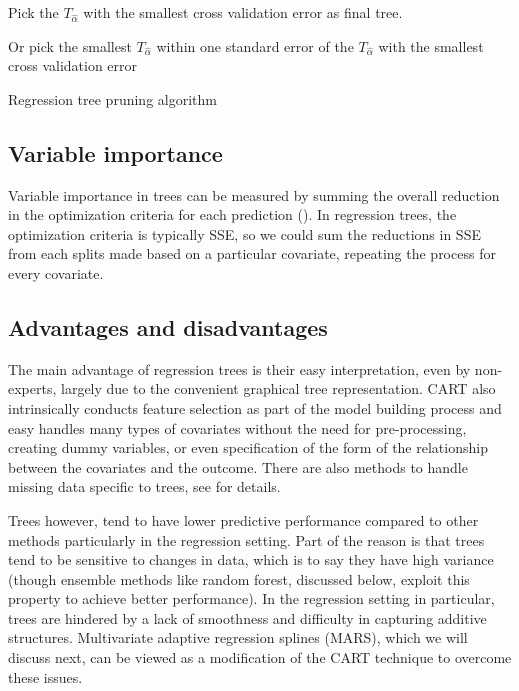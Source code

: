 \documentclass[12pt]{article}
\begin{document}
\begin{algorithm}[!htbp]
Pick the $T_{\hat{\alpha}}$ with the smallest cross validation error as final tree.

Or pick the smallest $T_{\hat{\alpha}}$ within one standard error of the $T_{\hat{\alpha}}$ with the smallest cross validation error
 \caption{Regression tree pruning algorithm}
\end{algorithm}



\subsection{Variable importance} %
\label{sub:variable_importance_in_cart}

Variable importance in trees can be measured by summing the overall reduction in the optimization criteria for each prediction (\cite{CART}). In regression trees, the optimization criteria is typically SSE, so we could sum the reductions in SSE from each splits made based on a particular covariate, repeating the process for every covariate.
%


\subsection{Advantages and disadvantages} %
\label{sub:advantages_and_disadvantages_to_cart}

The main advantage of regression trees is their easy interpretation, even by non-experts, largely due to the convenient graphical tree representation. CART also intrinsically conducts feature selection as part of the model building process and easy handles many types of covariates without the need for pre-processing, creating dummy variables, or even specification of the form of the relationship between the covariates and the outcome. There are also methods to handle missing data specific to trees, see \textcite{esl} for details.

Trees however, tend to have lower predictive performance compared to other methods particularly in the regression setting. Part of the reason is that trees tend to be sensitive to changes in data, which is to say they have high variance (though ensemble methods like random forest, discussed below, exploit this property to achieve better performance). In the regression setting in particular, trees are hindered by a lack of smoothness and difficulty in capturing additive structures. Multivariate adaptive regression splines (MARS), which we will discuss next, can be viewed as a modification of the CART technique to overcome these issues.
\end{document}

